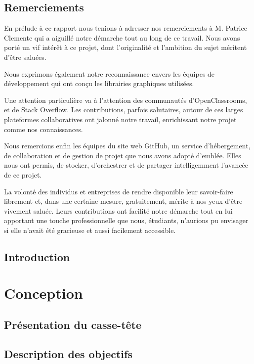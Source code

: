 \documentclass[a4paper,10pt]{report}
\begin{document}
\chapter*{Remerciements}
En prélude à ce rapport nous tenions à adresser nos remerciements à M. Patrice Clemente qui a aiguillé notre démarche tout au long de ce travail. Nous avons porté un vif intérêt à ce projet, dont l’originalité et l’ambition du sujet méritent d’être saluées.\newline

Nous exprimons également notre reconnaissance envers les équipes de développement qui ont conçu les librairies graphiques utilisées.\newline

Une attention particulière va à l’attention des communautés d’OpenClassrooms, et de Stack Overflow. Les contributions, parfois salutaires, autour de ces larges plateformes collaboratives ont jalonné notre travail, enrichissant notre projet comme nos connaissances.\newline

Nous remercions enfin les équipes du site web GitHub, un service d’hébergement, de collaboration et de gestion de projet que nous avons adopté d’emblée. Elles nous ont permis, de stocker, d’orchestrer et de partager intelligemment l’avancée de ce projet.\newline

La volonté des individus et entreprises de rendre disponible leur savoir-faire librement et, dans une certaine mesure, gratuitement, mérite à nos yeux d’être vivement saluée. Leurs contributions ont facilité notre démarche tout en lui apportant une touche professionnelle que nous, étudiants, n’aurions pu envisager si elle n’avait été gracieuse et aussi facilement accessible.

\chapter*{Introduction}


\tableofcontents

\part{Conception}
\chapter{Présentation du casse-tête}

\chapter{Description des objectifs} 
 
\end{document}

